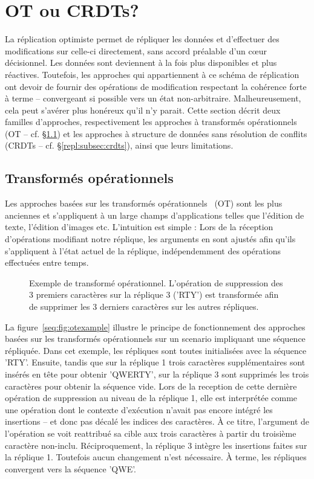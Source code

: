 
\section{OT ou CRDTs?}
\label{repl:sec:otorcrdts}

La réplication optimiste permet de répliquer les données et d'effectuer des
modifications sur celle-ci directement, sans accord préalable d'un cœur
décisionnel. Les données sont deviennent à la fois plus disponibles et plus
réactives. Toutefois, les approches qui appartiennent à ce schéma de réplication
ont devoir de fournir des opérations de modification respectant la cohérence
forte à terme -- convergeant si possible vers un état
non-arbitraire. Malheureusement, cela peut s'avérer plus honéreux qu'il n'y
parait. Cette section décrit deux familles d'approches, respectivement les
approches à transformés opérationnels (OT -- cf. §\ref{repl:subsec:ot}) et les
approches à structure de données sans résolution de conflits (CRDTs --
cf. §\ref{repl:subsec:crdts}), ainsi que leurs limitations.

\subsection{Transformés opérationnels}
\label{repl:subsec:ot}

Les approches basées sur les transformés opérationnels~\cite{sun1998operational,
  sun2009contextbased} (OT) sont les plus anciennes et s'appliquent à un large
champs d'applications telles que l'édition de texte, l'édition d'images
etc. L'intuition est simple : Lors de la réception d'opérations modifiant notre
réplique, les arguments en sont ajustés afin qu'ils s'appliquent à l'état actuel
de la réplique, indépendemment des opérations effectuées entre temps.

\begin{figure}
  \centering
  
  \caption{\label{repl:fig:otexample} Exemple de transformé
    opérationnel. L'opération de suppression des 3 premiers caractères sur la
    réplique 3 ('RTY') est transformée afin de supprimer les 3 derniers caractères
    sur les autres répliques.}
\end{figure}

La figure~\ref{seq:fig:otexample} illustre le principe de fonctionnement des
approches basées sur les transformés opérationnels sur un scenario impliquant
une séquence répliquée. Dans cet exemple, les répliques sont toutes initialisées
avec la séquence 'RTY'. Ensuite, tandis que sur la réplique 1 trois caractères
supplémentaires sont insérés en tête pour obtenir 'QWERTY', sur la réplique 3
sont supprimés les trois caractères pour obtenir la séquence vide. Lors de la
reception de cette dernière opération de suppression au niveau de la réplique 1,
elle est interprétée comme une opération dont le contexte d'exécution n'avait
pas encore intégré les insertions -- et donc pas décalé les indices des
caractères. À ce titre, l'argument de l'opération se voit reattribué sa cible
aux trois caractères à partir du troisième caractère non-inclu. Réciproquement,
la réplique 3 intègre les insertions faites sur la réplique 1. Toutefois aucun
changement n'est nécessaire. À terme, les répliques convergent vers la séquence
'QWE'.

